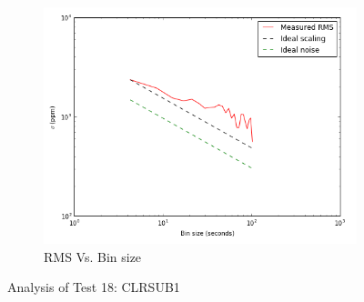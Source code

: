 \documentclass[conference]{IEEEtran}
\begin{document}
\begin{figure}[H]
    \begin{subfigure}{3}
        \includegraphics[scale=0.6]{rms_test18}
        \caption{RMS Vs. Bin size}
    \end{subfigure}
    \caption{Analysis of Test 18: CLRSUB1}
\end{figure}
\end{document}

